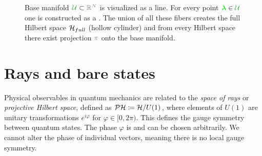 \begin{figure}[h]
    \centering

\caption{Base manifold $\greenn{\mathcal U}\subset \gray{\R^N}$ is visualized as a line. For every point $\green\llambda\in\greenn{\mathcal U}$ one  is constructed as a . The union of all these fibers creates the full Hilbert space $\mathcal{H}_{full}$ (hollow cylinder) and from every Hilbert space there exist projection $\gray{\pi}$ onto the base manifold.}
    \label{fig:wholeBundle}
\end{figure}



\section{Rays and bare states}
Physical observables in quantum mechanics are related to the \emph{space of rays} or \emph{projective Hilbert space}, defined as $\mathcal{P}\mathcal{H}\coloneqq \mathcal{H}/U(1)$, where elements of $U(1)$ are unitary transformations $e^{i\varphi}$ for $\varphi\in[0,2\pi)$. This defines the  gauge symmetry between quantum states. The phase $\varphi$ is  and can be chosen arbitrarily. We cannot alter the phase of individual vectors, meaning there is no local gauge symmetry. 

